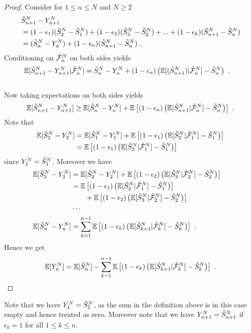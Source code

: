 %
\begin{proof}
	Consider for $1\leq n\leq N$ and $N\geq 2$
	\begin{align*}
	&  \tilde{S}_{n+1}^N - Y_{n+1}^N \\ 
	&= (1-\epsilon_1)(\tilde{S}_{2}^N - \tilde{S}_{1}^N) + (1-\epsilon_2)(\tilde{S}_{3}^N - \tilde{S}_{2}^N) + ... + (1-\epsilon_k)(\tilde{S}_{n+1}^N - \tilde{S}_{n}^N)\\ 
	&= (\tilde{S}_{n}^N - Y_{n}^N) + (1-\epsilon_n)(\tilde{S}_{n+1}^N - \tilde{S}_{n}^N) \textrm{ .}
	\end{align*}
	Conditioning on $\tilde{\mathcal{F}}_{n}^N$ on both sides yields
	\begin{align*}
		\mathbb{E}[\tilde{S}_{n+1}^N - Y_{n+1}^N|\tilde{\mathcal{F}}_{n}^N] &= \tilde{S}_{n}^N - Y_{n}^N + (1-\epsilon_n)\left(\mathbb{E}[(\tilde{S}_{n+1}^N)|\tilde{\mathcal{F}}_{n}^N]  - \tilde{S}_{n}^N \right)\textrm{ .}
	\end{align*}
	\\
	Now taking expectations on both sides yields
	$$\mathbb{E}[\tilde{S}_{n+1}^N - Y_{n+1}^N] \geq \mathbb{E}[\tilde{S}_{n}^N - Y_{n}^N] + \mathbb{E}\left[(1-\epsilon_n)\left(\mathbb{E}[\tilde{S}_{n+1}^N|\tilde{\mathcal{F}}_{n}^N]  - \tilde{S}_{n}^N \right)\right]\textrm{ .}$$
	Note that 
	\begin{align*}
		\mathbb{E}[\tilde{S}_{2}^N - Y_{2}^N] &= \mathbb{E}[\tilde{S}_{1}^N - Y_{1}^N] + \mathbb{E}\left[(1-\epsilon_1)\left(\mathbb{E}[\tilde{S}_{2}^N|\tilde{\mathcal{F}}_{1}^N]  - \tilde{S}_{1}^N \right)\right]\\ 
		&= \mathbb{E}\left[(1-\epsilon_1)\left(\mathbb{E}[\tilde{S}_{2}^N|\tilde{\mathcal{F}}_{1}^N]  - \tilde{S}_{1}^N \right)\right]\\ 
	\end{align*}
	since $Y_{1}^N = \tilde{S}_{1}^N$. Moreover we have
	\begin{align*}
		\mathbb{E}[\tilde{S}_{3}^N - Y_{3}^N] &= \mathbb{E}[\tilde{S}_{2}^N - Y_{2}^N] + \mathbb{E}\left[(1-\epsilon_2)\left(\mathbb{E}[\tilde{S}_{3}^N|\tilde{\mathcal{F}}_{2}^N]  - \tilde{S}_{2}^N \right)\right]\\  
		&= \mathbb{E}\left[(1-\epsilon_1)\left(\mathbb{E}[\tilde{S}_{2}^N|\tilde{\mathcal{F}}_{1}^N]  - \tilde{S}_{1}^N \right)\right]\\
		&\qquad + \mathbb{E}\left[(1-\epsilon_2)\left(\mathbb{E}[\tilde{S}_{3}^N|\tilde{\mathcal{F}}_{2}^N]  - \tilde{S}_{2}^N \right)\right]\\  
		&\cdots& \\ 
		\mathbb{E}[\tilde{S}_{n}^N - Y_{n}^N] &= \sum_{k=1}^{n-1}\mathbb{E}\left[(1-\epsilon_k)\left(\mathbb{E}[\tilde{S}_{k+1}^N|\tilde{\mathcal{F}}_{k}^N]  - \tilde{S}_{k}^N \right)\right]\textrm{ .}
	\end{align*}
	Hence we get
	\begin{equation*}
		\mathbb{E}[Y_{n}^N] = \mathbb{E}[\tilde{S}_{n}^N] - \sum_{k=1}^{n-1}\mathbb{E}\left[(1-\epsilon_k)\left(\mathbb{E}[\tilde{S}_{k+1}^N|\tilde{\mathcal{F}}_{k}^N]  - \tilde{S}_{k}^N \right)\right]\textrm{ .}
	\end{equation*}	
\end{proof}
%
\begin{remark}
	Note that we have $Y_{1}^N=\tilde{S}_{1}^N$, as the sum in the definition above is in this case empty and hence treated as zero. Moreover note that we have $Y_{n+1}^N = \tilde{S}_{n+1}^N$ if $\epsilon_k=1$ for all $1\leq k \leq n$. 
\end{remark}

